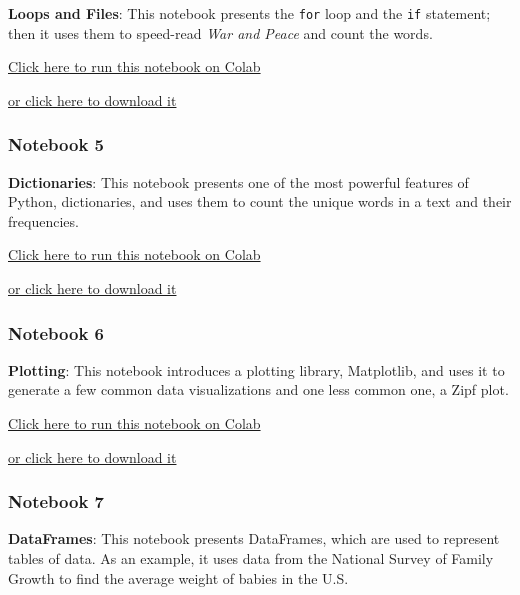 \textbf{Loops and Files}: This notebook presents the \texttt{for} loop
and the \texttt{if} statement; then it uses them to speed-read \emph{War
and Peace} and count the words.

\href{https://colab.research.google.com/github/AllenDowney/ElementsOfDataScience/blob/master/04_loops.ipynb}{Click
here to run this notebook on Colab}

\href{https://github.com/AllenDowney/ElementsOfDataScience/raw/master/04_loops.ipynb}{or
click here to download it}

\hypertarget{notebook-5}{%
\subsubsection{Notebook 5}\label{notebook-5}}

\textbf{Dictionaries}: This notebook presents one of the most powerful
features of Python, dictionaries, and uses them to count the unique
words in a text and their frequencies.

\href{https://colab.research.google.com/github/AllenDowney/ElementsOfDataScience/blob/master/05_dictionaries.ipynb}{Click
here to run this notebook on Colab}

\href{https://github.com/AllenDowney/ElementsOfDataScience/raw/master/05_dictionaries.ipynb}{or
click here to download it}

\hypertarget{notebook-6}{%
\subsubsection{Notebook 6}\label{notebook-6}}

\textbf{Plotting}: This notebook introduces a plotting library,
Matplotlib, and uses it to generate a few common data visualizations and
one less common one, a Zipf plot.

\href{https://colab.research.google.com/github/AllenDowney/ElementsOfDataScience/blob/master/06_plotting.ipynb}{Click
here to run this notebook on Colab}

\href{https://github.com/AllenDowney/ElementsOfDataScience/raw/master/06_plotting.ipynb}{or
click here to download it}

\hypertarget{notebook-7}{%
\subsubsection{Notebook 7}\label{notebook-7}}

\textbf{DataFrames}: This notebook presents DataFrames, which are used
to represent tables of data. As an example, it uses data from the
National Survey of Family Growth to find the average weight of babies in
the U.S.

